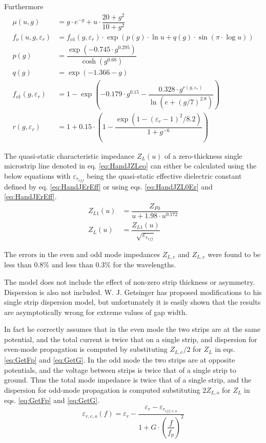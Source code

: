 Furthermore
\begin{align}
\mu\left(u,g\right) &= g\cdot e^{-g}+ u\cdot \dfrac{20+g^2}{10+g^2}\\
f_o\left(u,g,\varepsilon_r\right) &= f_{o1}\left(g,\varepsilon_r\right)\cdot \exp{\left(p(g)\cdot \ln{u} + q(g)\cdot \sin{\left(\pi\cdot\log{u}\right)}\right)}\\
p(g) &= \dfrac{\exp{\left(-0.745\cdot g^{0.295}\right)}}{\cosh{\left(g^{0.68}\right)}}\\
q(g) &= \exp{\left(-1.366-g\right)}\\
f_{o1}\left(g,\varepsilon_r\right) &= 1 - \exp{\left(-0.179\cdot g^{0.15} - \dfrac{0.328\cdot g^{r\left(g,\varepsilon_r\right)}}{\ln{\left(e + \left(g/7\right)^{2.8}\right)}}\right)}\\
r\left(g,\varepsilon_r\right) &= 1+0.15\cdot\left(1 - \dfrac{\exp{\left(1-\left(\varepsilon_r - 1\right)^2/8.2\right)}}{1+g^{-6}}\right)
\end{align}

The quasi-static characteristic impedance $Z_L(u)$ of a zero-thickness
single microstrip line denoted in eq. \eqref{eq:HandJZLeo} can either
be calculated using the below equations with $\varepsilon_{r_{eff}}$
being the quasi-static effective dielectric constant defined by
eq. \eqref{eq:HandJErEff} or using eqs. \eqref{eq:HandJZL0Er} and
\eqref{eq:HandJErEff}.
\begin{align}
Z_{L1}(u) &= \dfrac{Z_{F0}}{u + 1.98\cdot u^{0.172}}\\
Z_{L}(u) &= \dfrac{Z_{L1}(u)}{\sqrt{\varepsilon_{r_{eff}}}}
\end{align}

The errors in the even and odd mode impedances $Z_{L,e}$ and $Z_{L,e}$
were found to be less than 0.8\% and less than 0.3\% for the
wavelengths.

\addvspace{12pt}

The model does not include the effect of non-zero strip thickness or
asymmetry.  Dispersion is also not included.  W. J. Getsinger
\cite{Getsinger4} has proposed modifications to his single strip
dispersion model, but unfortunately it is easily shown that the
results are asymptotically wrong for extreme values of gap width.

\addvspace{12pt}

In fact he correctly assumes that in the even mode the two strips are
at the same potential, and the total current is twice that on a single
strip, and dispersion for even-mode propagation is computed by
substituting $Z_{L,e}/2$ for $Z_L$ in eqs. \eqref{eq:GetFp} and
\eqref{eq:GetG}.  In the odd mode the two strips are at opposite
potentials, and the voltage between strips is twice that of a single
strip to ground.  Thus the total mode impedance is twice that of a
single strip, and the dispersion for odd-mode propagation is computed
substituting $2Z_{L,o}$ for $Z_L$ in eqs. \eqref{eq:GetFp} and
\eqref{eq:GetG}.
\begin{equation}
\varepsilon_{r,e,o}\left(f\right) = \varepsilon_{r} - \frac{\varepsilon_{r} - \varepsilon_{r_{eff,e,o}}}{1 + G\cdot \left(\dfrac{f}{f_{p}}\right)^{2}}
\end{equation}

